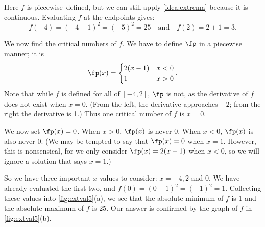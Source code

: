 {%
Here $f$ is piecewise--defined, but we can still apply \autoref{idea:extrema} because it is continuous. Evaluating $f$ at the endpoints gives: 
\[f(-4)=(-4-1)^2=(-5)^2 = 25 \quad \text{and} \quad f(2)=2+1 = 3.\]

We now find the critical numbers of $f$. We have to define $\fp$ in a piecewise manner; it is $$\fp(x) =\begin{cases} 2(x-1) & x < 0 \\ 1 & x>0 \end{cases} .$$ Note that while $f$ is defined for all of $[-4,2]$, $\fp$ is not, as the derivative of $f$ does not exist when $x=0$. (From the left, the derivative approaches $-2$; from the right the derivative is 1.) Thus one critical number of $f$ is $x=0$.

We now set $\fp(x) = 0$. When $x >0$, $\fp(x)$ is never 0.  When $x<0$, $\fp(x)$ is also never 0. (We may be tempted to say that $\fp(x) = 0 $ when $x=1$. However, this is nonsensical, for we only consider $\fp(x) = 2(x-1)$ when $x<0$, so we will ignore a solution that says $x=1$.) 

So we have three important $x$ values to consider: $x= -4, 2$ and $0$. We have already evaluated the first two, and $f(0)=(0-1)^2=(-1)^2=1$.  Collecting these values into \autoref{fig:extval5}(a), we see that the absolute minimum of $f$ is 1 and the absolute maximum of $f$ is $25$. Our answer is confirmed by the graph of $f$ in \autoref{fig:extval5}(b).}

